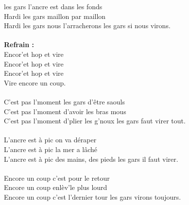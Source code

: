 
 les gars l'ancre est dans les fonds
\\Hardi les gars maillon par maillon
\\Hardi les gars nous l'arracherons les gars si nous virons.
\\\\\textbf{Refrain :}
\\Encor'et hop et vire
\\Encor'et hop et vire
\\Encor'et hop et vire
\\Vire encore un coup.
\\\\C'est pas l'moment les gars d'être saouls
\\C'est pas l'moment d'avoir les bras mous
\\C'est pas l'moment d'plier les g'noux les gars faut virer tout.
\\\\L'ancre est à pic on va déraper
\\L'ancre est à pic la mer a lâché
\\L'ancre est à pic des mains, des pieds les gars il faut virer.
\\\\Encore un coup c'est pour le retour
\\Encore un coup enlèv’le plus lourd
\\Encore un coup c'est l'dernier tour les gars virons toujours.


\breakpage